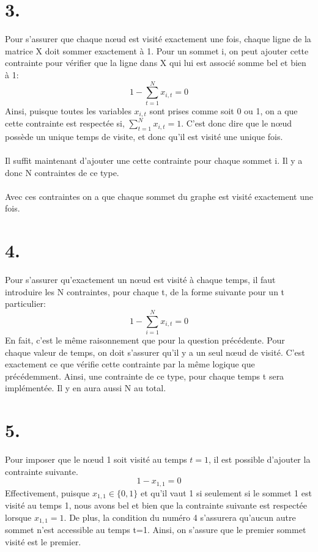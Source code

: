 \documentclass{article}
\begin{document}
\section*{3.}
Pour s'assurer que chaque nœud est visité exactement une fois, chaque ligne de la matrice X doit sommer exactement à 1. Pour un sommet i, on peut ajouter cette contrainte pour vérifier que la ligne dans X qui lui est associé somme bel et bien à 1:
\begin{equation*}
    1-\sum_{t=1}^N x_{i,t} = 0
\end{equation*}
Ainsi, puisque toutes les variables $x_{i, t}$ sont prises comme soit 0 ou 1, on a que cette contrainte est respectée si, $\sum_{t = 1}^Nx_{i, t} = 1$. C'est donc dire que le nœud possède un unique temps de visite, et donc qu'il est visité une unique fois. 
\\\\
Il suffit maintenant d'ajouter une cette contrainte pour chaque sommet i. Il y a donc N contraintes de ce type.
\\\\
Avec ces contraintes on a que chaque sommet du graphe est visité exactement une fois.


\section*{4.}
Pour s'assurer qu'exactement un nœud est visité à chaque temps, il faut introduire les N contraintes, pour chaque t, de la forme  suivante pour un t particulier:
\begin{equation*}
    1-\sum_{i=1}^N x_{i,t} = 0
\end{equation*}
En fait, c'est le même raisonnement que pour la question précédente. Pour chaque valeur de temps, on doit s'assurer qu'il y a un seul nœud de visité. C'est exactement ce que vérifie cette contrainte par la même logique que précédemment. Ainsi, une contrainte de ce type, pour chaque temps t sera implémentée. Il y en aura aussi N au total. 



\section*{5.}
Pour imposer que le nœud 1 soit visité au temps $t=1$, il est possible d'ajouter la contrainte suivante.
\begin{equation*}
    1-x_{1,1} = 0
\end{equation*}
Effectivement, puisque $x_{1,1}\in \{0,1\}$ et qu'il vaut 1 si seulement si le sommet 1 est visité au temps 1, nous avons bel et bien que la contrainte suivante est respectée lorsque $x_{1,1}=1$. De plus, la condition du numéro 4 s'assurera qu'aucun autre sommet n’est accessible au temps t=1. Ainsi, on s'assure que le premier sommet visité est le premier.
\end{document}
